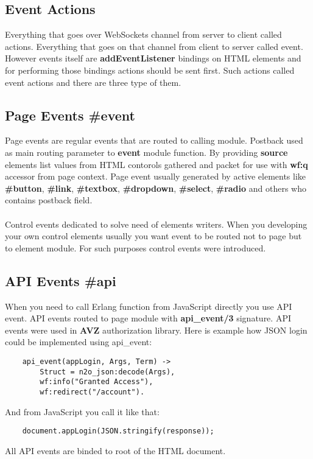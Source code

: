 \subsection*{Event Actions}
Everything that goes over WebSockets channel from server to client called actions.
Everything that goes on that channel from client to server called event. However
events itself are {\bf addEventListener} bindings on HTML elements and for performing those bindings
actions should be sent first. Such actions called event actions and there are three type
of them.

\subsection{Page Events \#event}
Page events are regular events that are routed to calling module. Postback used as main
routing parameter to {\bf event} module function. By providing {\bf source} elements list
values from HTML contorols gathered and packet for use with {\bf wf:q} accessor from page context.
Page event usually generated by active elements like {\bf \#button}, {\bf \#link},
{\bf \#textbox}, {\bf \#dropdown}, {\bf \#select}, {\bf \#radio} and others who contains postback field.

\paragraph{}
Control events dedicated to solve need of elements writers. When you developing your
own control elements usually you want event to be routed not to page but to element module.
For such purposes control events were introduced.

\subsection{API Events \#api}
When you need to call Erlang function from JavaScript directly you use API event.
API events routed to page module with {\bf api\_event/3} signature. API events were
used in {\bf AVZ} authorization library. Here is example how JSON login could be
implemented using api\_event:

\vspace{1\baselineskip}
\begin{lstlisting}
    api_event(appLogin, Args, Term) ->
        Struct = n2o_json:decode(Args),
        wf:info("Granted Access"),
        wf:redirect("/account").
\end{lstlisting}
\vspace{1\baselineskip}
And from JavaScript you call it like that:
\vspace{1\baselineskip}
\begin{lstlisting}
    document.appLogin(JSON.stringify(response));
\end{lstlisting}
\vspace{1\baselineskip}
All API events are binded to root of the HTML document.



